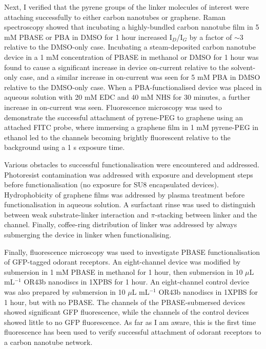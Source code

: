 \documentclass[
  a4paper,
]{scrbook}
\begin{document}
Next, I verified that the pyrene groups of the linker molecules of
interest were attaching successfully to either carbon nanotubes or
graphene. Raman spectroscopy showed that incubating a highly-bundled
carbon nanotube film in 5 mM PBASE or PBA in DMSO for 1 hour increased
I\(_D\)/I\(_G\) by a factor of \(\sim 3\) relative to the DMSO-only
case. Incubating a steam-deposited carbon nanotube device in a 1 mM
concentration of PBASE in methanol or DMSO for 1 hour was found to cause
a significant increase in device on-current relative to the solvent-only
case, and a similar increase in on-current was seen for 5 mM PBA in DMSO
relative to the DMSO-only case. When a PBA-functionalised device was
placed in aqueous solution with 20 mM EDC and 40 mM NHS for 30 minutes,
a further increase in on-current was seen. Fluorescence microscopy was
used to demonstrate the successful attachment of pyrene-PEG to graphene
using an attached FITC probe, where immersing a graphene film in 1 mM
pyrene-PEG in ethanol led to the channels becoming brightly fluorescent
relative to the background using a 1 s exposure time.

Various obstacles to successful functionalisation were encountered and
addressed. Photoresist contamination was addressed with exposure and
development steps before functionalisation (no exposure for SU8
encapsulated devices). Hydrophobicity of graphene films was addressed by
plasma treatment before functionalisation in aqueous solution. A
surfactant rinse was used to distinguish between weak substrate-linker
interaction and \(\pi\)-stacking between linker and the channel.
Finally, coffee-ring distribution of linker was addressed by always
submerging the device in linker when functionalising.

Finally, fluorescence microscopy was used to investigate PBASE
functionalisation of GFP-tagged odorant receptors. An eight-channel
device was modified by submersion in 1 mM PBASE in methanol for 1 hour,
then submersion in 10 \(\mu\)L mL\(^{-1}\) OR43b nanodiscs in 1XPBS for
1 hour. An eight-channel control device was also prepared by submersion
in 10 \(\mu\)L mL\(^{-1}\) OR43b nanodiscs in 1XPBS for 1 hour, but with
no PBASE. The channels of the PBASE-submersed devices showed significant
GFP fluorescence, while the channels of the control devices showed
little to no GFP fluorescence. As far as I am aware, this is the first
time fluorescence has been used to verify successful attachment of
odorant receptors to a carbon nanotube network.

\end{document}
